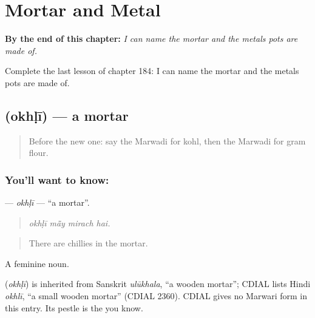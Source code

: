 
\chapter{Mortar and Metal}
\label{ch:mw-mortar-and-metal}

\begin{chapteropening}
\textbf{By the end of this chapter:} \emph{I can name the mortar and the metals pots are made of.}

Complete the last lesson of chapter 184: I can name the mortar and the metals pots are made of.
\end{chapteropening}

\section[\texorpdfstring{\mw{ओखळी} (okhḷī)}{ओखळी (okhḷī)}]{ (okhḷī) — a mortar}

\label{lesson:MW-C184-okhli}



\begin{quote}
Before the new one: say the Marwadi for kohl, then the Marwadi for gram flour.
\end{quote}

\subsection*{You'll want to know: }
\textbf{} — \emph{okhḷī} — \textquotedblleft{}a mortar\textquotedblright{}.

\begin{quote}
   
\end{quote}

\begin{quote}
\emph{okhḷī mā̃y mirach hai.}
\end{quote}

\begin{quote}
There are chillies in the mortar.
\end{quote}

A feminine noun.

\begin{cousinweb}
\textbf{} (\emph{okhḷī}) is inherited from Sanskrit \emph{ulūkhala}, \textquotedblleft{}a wooden mortar\textquotedblright{}; CDIAL lists Hindi \emph{okhlī}, \textquotedblleft{}a small wooden mortar\textquotedblright{} (CDIAL 2360). CDIAL gives no Marwari form in this entry. Its pestle is the \textbf{} you know.
\end{cousinweb}

